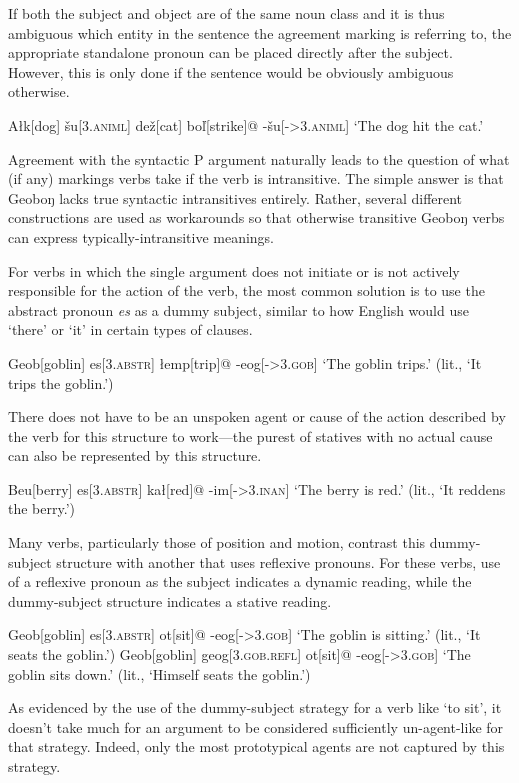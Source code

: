\documentclass[10pt]{article}
\newcommand{\sk}{\textsc}
\newcommand{\vz}{ž}
\newcommand{\vs}{š}
\newcommand{\vl}{ľ}
\newcommand{\engma}{ŋ}
\begin{document}
If both the subject and object are of the same noun class and it is thus ambiguous which entity in the sentence the agreement marking is referring to, the appropriate standalone pronoun can be placed directly after the subject. However, this is only done if the sentence would be obviously ambiguous otherwise.

\ex
\begingl
A\l k[dog]
\vs u[\sk{3.animl}]
de{\vz}[cat]
bo\vl[strike]@
-\vs u[-\sk{>3.animl}]
\glft `The dog hit the cat.'
\endgl
\xe

Agreement with the syntactic P argument naturally leads to the question of what (if any) markings verbs take if the verb is intransitive. The simple answer is that Geobo{\engma} lacks true syntactic intransitives entirely. Rather, several different constructions are used as workarounds so that otherwise transitive Geobo{\engma} verbs can express typically-intransitive meanings.

For verbs in which the single argument does not initiate or is not actively responsible for the action of the verb, the most common solution is to use the abstract pronoun \textit{es} as a dummy subject, similar to how English would use `there' or `it' in certain types of clauses. 

\ex 
\begingl
Geob[goblin]
es[3.\sk{abstr}] 
\l emp[trip]@
-eog[-\sk{>3.gob}]
\glft `The goblin trips.' (lit., `It trips the goblin.')
\endgl
\xe

There does not have to be an unspoken agent or cause of the action described by the verb for this structure to work---the purest of statives with no actual cause can also be represented by this structure.

\ex
\begingl
Beu[berry]
es[\sk{3.abstr}]
ka\l[red]@
-im[-\sk{>3.inan}]
\glft `The berry is red.' (lit., `It reddens the berry.')
\endgl
\xe

Many verbs, particularly those of position and motion, contrast this dummy-subject structure with another that uses reflexive pronouns. For these verbs, use of a reflexive pronoun as the subject indicates a dynamic reading, while the dummy-subject structure indicates a stative reading.

\pex
\a
\begingl
Geob[goblin]
es[\sk{3.abstr}]
ot[sit]@
-eog[-\sk{>3.gob}]
\glft `The goblin is sitting.' (lit., `It seats the goblin.')
\endgl
\a
\begingl
Geob[goblin]
geog[\sk{3.gob.refl}]
ot[sit]@
-eog[-\sk{>3.gob}]
\glft `The goblin sits down.' (lit., `Himself seats the goblin.')
\endgl
\xe

As evidenced by the use of the dummy-subject strategy for a verb like `to sit', it doesn't take much for an argument to be considered sufficiently un-agent-like for that strategy. Indeed, only the most prototypical agents are not captured by this strategy.
\end{document}
